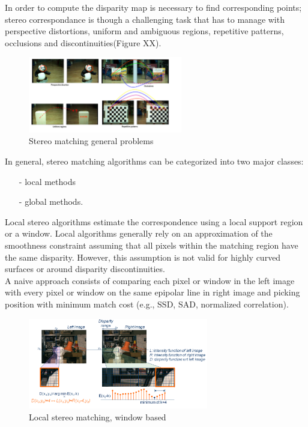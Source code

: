 In order to compute the disparity map is necessary to find corresponding points; stereo correspondance is though a challenging task that has to manage with perspective distortions, uniform and ambiguous regions, repetitive patterns, occlusions and discontinuities(Figure XX).\\
\begin{figure}[h!]
\centering
\includegraphics[width=0.6\textwidth]{./img/occl.png}
\caption{\small{Stereo matching general problems}}
\label{fig:occl}
\end{figure}
In general, stereo matching algorithms can be categorized into two major classes:
\begin{itemize}
\item[-] local methods 
\item[-] global methods.
\end{itemize}
Local stereo algorithms estimate the correspondence using a local support region or a window. Local algorithms generally rely on an approximation of the smoothness constraint assuming that all pixels within the matching region have the same disparity. However, this assumption is not valid for highly curved surfaces or around disparity discontinuities.\\
A naive approach consists of comparing each  pixel or window in the left image with every pixel or window on the same epipolar line in right image and picking position with minimum match cost (e.g., SSD, SAD, normalized correlation).\\ 
\begin{figure}[h!]
\centering
\includegraphics[width=0.7\textwidth]{./img/local.png}
\caption{\small{Local stereo matching, window based}}
\label{fig:local}
\end{figure}
